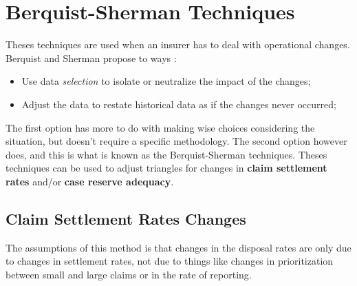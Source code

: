 \documentclass[11pt, english]{memoir}
\numberwithin{definition}{section}
\begin{document}
	
\chapter{Berquist-Sherman Techniques}

Theses techniques are used when an insurer has to deal with operational changes. Berquist and Sherman propose to ways : 
\begin{itemize}
	\item Use data \emph{selection} to isolate or neutralize the impact of the changes;
	\item Adjust the data to restate historical data as if the changes never occurred; 
\end{itemize}
	
The first option has more to do with making wise choices considering the situation, but doesn't require a specific methodology. The second option however does, and this is what is known as the Berquist-Sherman techniques. Theses techniques can be used to adjust triangles for changes in \textbf{claim settlement rates} and/or \textbf{case reserve adequacy}.

\section{Claim Settlement Rates Changes}
	 
	The assumptions of this method is that changes in the disposal rates are only due to changes in settlement rates, not due to things like changes in prioritization between small and large claims or in the rate of reporting. 
	
\end{document}
